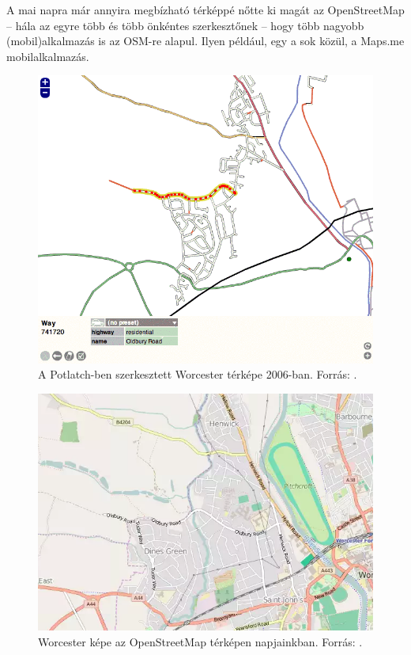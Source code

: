 \documentclass[a4paper,12pt]{report}
\begin{document}
A mai napra már annyira megbízható térképpé nőtte ki magát az OpenStreetMap -- hála az egyre több és több önkéntes szerkesztőnek -- hogy több nagyobb (mobil)alkalmazás is az OSM-re alapul. Ilyen például, egy a sok közül, a Maps.me \cite{mapsme} mobilalkalmazás.

\begin{figure}[ht]
\centering
\includegraphics[width=5in]{img/oldworcester}
\caption{A Potlatch-ben szerkesztett Worcester térképe 2006-ban. Forrás: \cite{osmhistory}.}
\label{oldworcester}
\end{figure}

\begin{figure}
\centering
\includegraphics[width=5in]{img/newworcester}
\caption{Worcester képe az OpenStreetMap térképen napjainkban. Forrás: \cite{osm}.}
\label{newworcester}
\end{figure}
\end{document}
